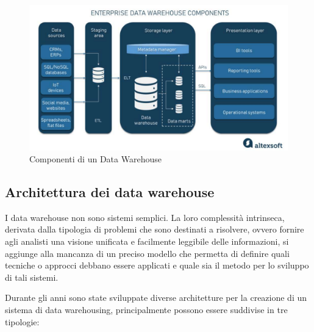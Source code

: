 \begin{figure}[H]
    \centering
    \includegraphics[width=0.8\linewidth]{figure/capitolo_2/Data Warehouse Components.pdf}
    \caption{Componenti di un Data Warehouse}
    \label{fig:Data Warehouse Components}
\end{figure}

\subsection{Architettura dei data warehouse}

I data warehouse non sono sistemi semplici. La loro complessità intrinseca, derivata dalla tipologia di problemi che sono destinati a risolvere, ovvero fornire agli analisti una visione unificata e facilmente leggibile delle informazioni, si aggiunge alla mancanza di un preciso modello che permetta di definire quali tecniche o approcci debbano essere applicati e quale sia il metodo per lo sviluppo di tali sistemi.\cite{kelly_data_warehousing_in_action}

Durante gli anni sono state sviluppate diverse architetture per la creazione di un sistema di data warehousing, principalmente possono essere suddivise in tre tipologie:\cite{interviewbit_data_warehouse_architecture}

